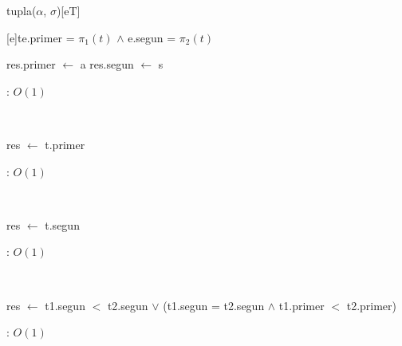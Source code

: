 \begin{Representacion}

	\begin{Estructura}{tupla($\alpha$, $\sigma$)}[eT]
		\begin{Tupla}[eT]
		\end{Tupla}
	\end{Estructura}





	{t}{e.primer = $\pi_1 (t)$ $\land$ e.segun = $\pi_2 (t)$}
\end{Representacion}

\begin{Algoritmos}

	\begin{algorithm}[H]
		\NoCaptionOfAlgo
		\caption{}
		res.primer $\leftarrow$ a
		res.segun $\leftarrow$ s
	\end{algorithm}

	\complejidad: $O(1)$


	~

	\begin{algorithm}[H]
		\NoCaptionOfAlgo
		\caption{}
		res $\leftarrow$ t.primer
	\end{algorithm}

	\complejidad: $O(1)$

	~

	\begin{algorithm}[H]
		\NoCaptionOfAlgo
		\caption{}
		res $\leftarrow$ t.segun
	\end{algorithm}

	\complejidad: $O(1)$

	~

	\begin{algorithm}[H]
		\NoCaptionOfAlgo
		\caption{}
		res $\leftarrow$ t1.segun $<$ t2.segun $\lor$ (t1.segun = t2.segun $\land$ t1.primer $<$ t2.primer)
	\end{algorithm}

	\complejidad: $O(1)$
\end{Algoritmos}